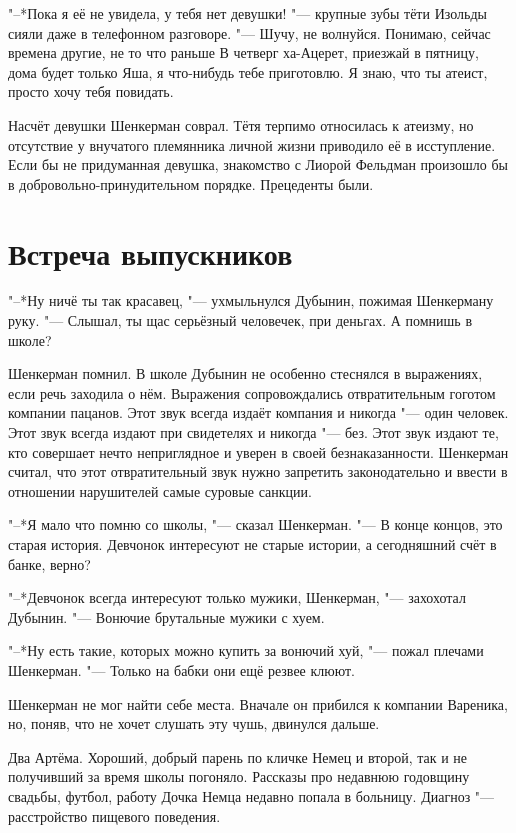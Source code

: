 "--*Пока я её не увидела, у тебя нет девушки! "--- крупные зубы тёти Изольды сияли даже в телефонном разговоре.
"--- Шучу, не волнуйся.
Понимаю, сейчас времена другие, не то что раньше\ldotst
В четверг ха-Ацерет, приезжай в пятницу, дома будет только Яша, я что-нибудь тебе приготовлю.
Я знаю, что ты атеист, просто хочу тебя повидать.

Насчёт девушки Шенкерман соврал.
Тётя терпимо относилась к атеизму, но отсутствие у внучатого племянника личной жизни приводило её в исступление.
Если бы не придуманная девушка, знакомство с Лиорой Фельдман произошло бы в добровольно-принудительном порядке.
Прецеденты были.

\section{Встреча выпускников}

"--*Ну ничё ты так красавец, "--- ухмыльнулся Дубынин, пожимая Шенкерману руку.
"--- Слышал, ты щас серьёзный человечек, при деньгах.
А помнишь в школе?

Шенкерман помнил.
В школе Дубынин не особенно стеснялся в выражениях, если речь заходила о нём.
Выражения сопровождались отвратительным гоготом компании пацанов.
Этот звук всегда издаёт компания и никогда "--- один человек.
Этот звук всегда издают при свидетелях и никогда "--- без.
Этот звук издают те, кто совершает нечто неприглядное и уверен в своей безнаказанности.
Шенкерман считал, что этот отвратительный звук нужно запретить законодательно и ввести в отношении нарушителей самые суровые санкции.

"--*Я мало что помню со школы, "--- сказал Шенкерман.
"--- В конце концов, это старая история.
Девчонок интересуют не старые истории, а сегодняшний счёт в банке, верно?

"--*Девчонок всегда интересуют только мужики, Шенкерман, "--- захохотал Дубынин.
"--- Вонючие брутальные мужики с хуем.

"--*Ну есть такие, которых можно купить за вонючий хуй, "--- пожал плечами Шенкерман.
"--- Только на бабки они ещё резвее клюют.

\spacing

Шенкерман не мог найти себе места.
Вначале он прибился к компании Вареника, но, поняв, что не хочет слушать эту чушь, двинулся дальше.

Два Артёма.
Хороший, добрый парень по кличке Немец и второй, так и не получивший за время школы погоняло.
Рассказы про недавнюю годовщину свадьбы, футбол, работу\ldotst
Дочка Немца недавно попала в больницу.
Диагноз "--- расстройство пищевого поведения.

